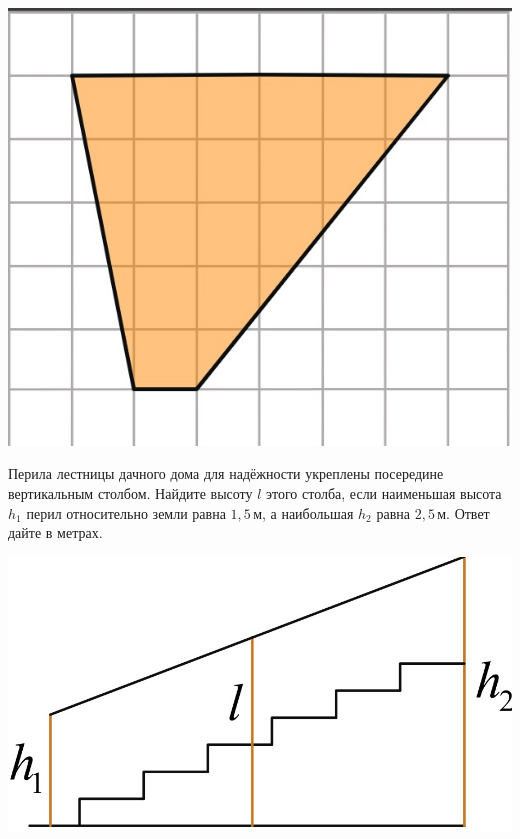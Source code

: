 \begin{class}[number=6]
\begin{listofex}
\begin{minipage}[t]{0.27\linewidth}
			\includegraphics[align=t, width=\linewidth]{../pics/G101M8L6-4}
		\end{minipage}
		\item
		\begin{minipage}[t]{0.68\linewidth}
			Перила лестницы дачного дома для надёжности укреплены посередине вертикальным столбом. Найдите высоту \(l\) этого столба, если наименьшая высота \(h_1\) перил относительно земли равна \(1,5\) м, а наибольшая \(h_2\) равна \(2,5\) м. Ответ дайте в метрах.
		\end{minipage}
		\hspace{0.02\linewidth}
		\begin{minipage}[t]{0.27\linewidth}
			\includegraphics[align=t, width=\linewidth]{../pics/G101M8L6-5}
		\end{minipage}

\end{listofex}
\end{class}
